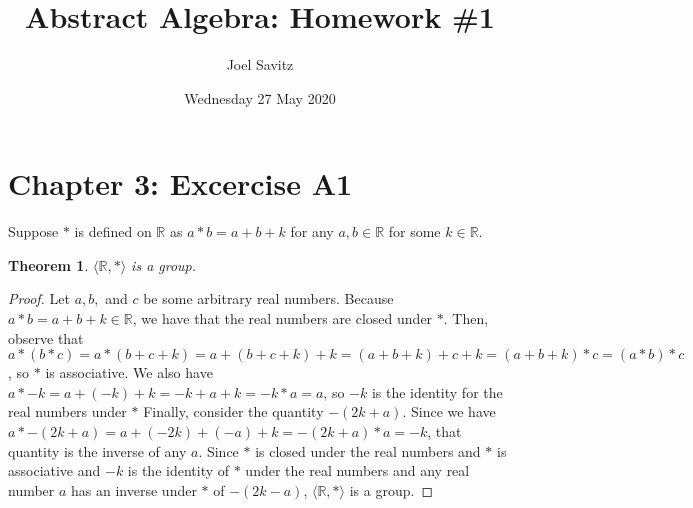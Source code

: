 \documentclass[12pt]{article}
\title{Abstract Algebra: Homework \#1}
\date{Wednesday 27 May 2020}
\author{Joel Savitz}
\newcommand{\reals}{\mathbb{R}}
\newtheorem{thm}{Theorem}
\begin{document}
\maketitle

\section{Chapter 3: Excercise A1}

Suppose $*$ is defined on $\mathbb{R}$ as $a * b = a + b + k$ for any $a,b \in \reals$ for some $k \in \reals$.

\begin{thm}
	$\langle \reals, * \rangle$ is a group.
\end{thm}

\begin{proof}
	Let $a,b,$ and $c$ be some arbitrary real numbers.
	Because $a * b = a + b + k \in \reals$, we have that the real numbers are closed under $*$.
	Then, observe that $a * (b * c)  = a * (b + c + k) = a + (b + c + k) + k = (a + b + k) + c + k = (a + b + k) * c = (a * b) * c$, so $*$ is associative.
	We also have $a * -k = a + (-k) + k = -k + a + k = -k * a = a$, so $-k$ is the identity for the real numbers under $*$
	Finally, consider the quantity $-(2k+a)$. Since we have $a * -(2k+a) = a + (-2k) +  (-a) + k = -(2k+a) * a = -k$, that quantity is the inverse of any $a$.
	Since $*$ is closed under the real numbers and $*$ is associative and $-k$ is the identity of $*$ under the real numbers and any real number $a$ has an inverse under $*$ of $-(2k-a)$, $\langle \reals, * \rangle$ is a group.
\end{proof}
\end{document}
